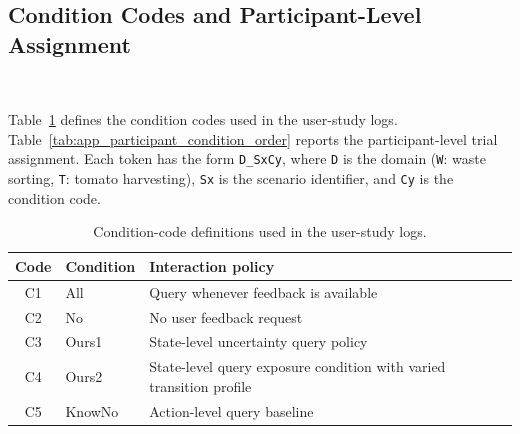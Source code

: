 \subsection{Condition Codes and Participant-Level Assignment}~\label{appx:user_assignment}

Table~\ref{tab:app_condition_codes} defines the condition codes used in the user-study logs. Table~\ref{tab:app_participant_condition_order} reports the participant-level trial assignment. Each token has the form \texttt{D\_SxCy}, where \texttt{D} is the domain (\texttt{W}: waste sorting, \texttt{T}: tomato harvesting), \texttt{Sx} is the scenario identifier, and \texttt{Cy} is the condition code.

\begin{table}[h]
\centering
\caption{Condition-code definitions used in the user-study logs.}
\label{tab:app_condition_codes}
\small
\begin{tabular}{cll}
\toprule
\textbf{Code} & \textbf{Condition} & \textbf{Interaction policy} \\
\midrule
C1 & All & Query whenever feedback is available \\
C2 & No & No user feedback request \\
C3 & Ours1 & State-level uncertainty query policy \\
C4 & Ours2 & State-level query exposure condition with varied transition profile \\
C5 & KnowNo & Action-level query baseline \\
\bottomrule
\end{tabular}
\end{table}

